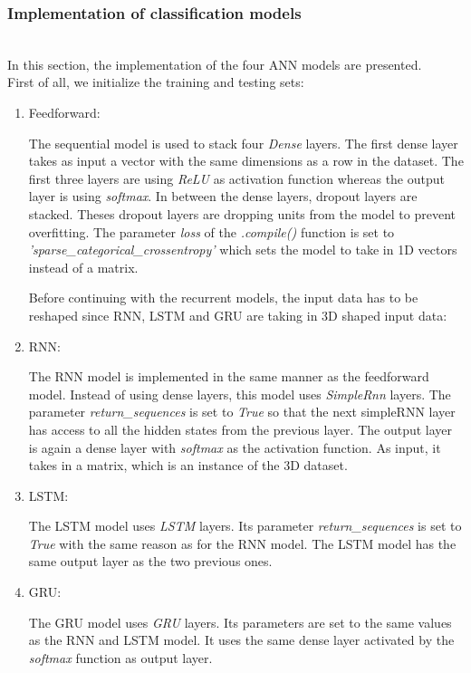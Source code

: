 \subsubsection{Implementation of classification models}\label{implementation}~\\

In this section, the implementation of the four ANN models are presented.\\

First of all, we initialize the training and testing sets:


\begin{enumerate}[label=\arabic*.]
  \item Feedforward:
    
    The sequential model is used to stack four \textit{Dense} layers. The first
    dense layer takes as input a vector with the same dimensions as a row in the
    dataset. The first three layers are using \textit{ReLU} as activation
    function whereas the output layer is using \textit{softmax}. In between the
    dense layers, dropout layers are stacked. Theses dropout layers are dropping
    units from the model to prevent overfitting. The parameter \textit{loss} of
    the \textit{.compile()} function is set to
    \textit{'sparse\_categorical\_crossentropy'} which sets the model to take in
    1D vectors instead of a matrix.\\

  \begin{normalize}
    Before continuing with the recurrent models, the input data has to be
    reshaped since RNN, LSTM and GRU are taking in 3D shaped input data:
    ~\\
  \end{normalize}
  \item RNN:
    
    The RNN model is implemented in the same manner as the feedforward model.
    Instead of using dense layers, this model uses \textit{SimpleRnn} layers.
    The parameter \textit{return\_sequences} is set to \textit{True} so that the
    next simpleRNN layer has access to all the hidden states from the previous
    layer.  The output layer is again a dense layer with \textit{softmax} as the
    activation function. As input, it takes in a matrix, which is an instance of
    the 3D dataset.~\\

  \item LSTM:
    
    The LSTM model uses \textit{LSTM} layers. Its parameter
    \textit{return\_sequences} is set to \textit{True} with the same reason as
    for the RNN model. The LSTM model has the same output layer as the two
    previous ones.\\
  \item GRU:
    
    The GRU model uses \textit{GRU} layers. Its parameters are set to the same
    values as the RNN and LSTM model. It uses the same dense layer activated by
    the \textit{softmax} function as output layer.
\end{enumerate}
